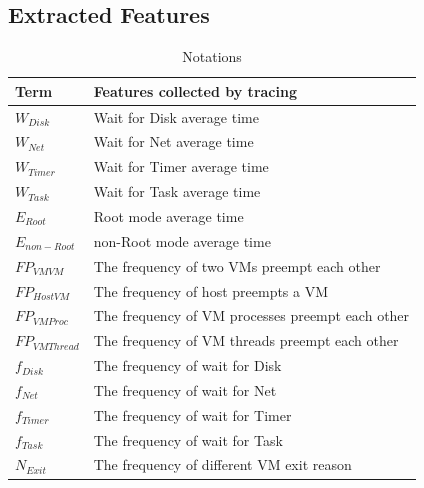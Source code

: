 \documentclass[10pt, conference, compsocconf]{IEEEtran}
\begin{document}
\subsection{Extracted Features}








\begin{table}
\caption{Notations}
\centering
\begin{tabular}{ll}
  \hline
  \rowcolor{Gray}
  \footnotesize \textbf{Term} & \footnotesize \textbf{Features collected by tracing} \\
  \hline
  \hline
  \footnotesize \textit{$W_{Disk}$} & \footnotesize Wait for Disk average time\\
  \footnotesize \textit{$W_{Net}$} & \footnotesize Wait for Net average time\\
  \footnotesize \textit{$W_{Timer}$} & \footnotesize Wait for Timer average time\\
  \footnotesize \textit{$W_{Task}$} & \footnotesize Wait for Task average time\\
  \footnotesize \textit{$E_{Root}$} & \footnotesize Root mode average time\\
  \footnotesize \textit{$E_{non-Root}$} & \footnotesize non-Root mode average time\\
  \footnotesize \textit{$FP_{VMVM}$} & \footnotesize The frequency of two VMs preempt each other\\
  \footnotesize \textit{$FP_{HostVM}$} & \footnotesize The frequency of host preempts a VM\\
  \footnotesize \textit{$FP_{VMProc}$} & \footnotesize The frequency of VM processes preempt each other\\
  \footnotesize \textit{$FP_{VMThread}$} & \footnotesize The frequency of VM threads preempt each other\\
  \footnotesize \textit{$f_{Disk}$} & \footnotesize The frequency of wait for Disk\\
  \footnotesize \textit{$f_{Net}$} & \footnotesize The frequency of wait for Net\\
  \footnotesize \textit{$f_{Timer}$} & \footnotesize The frequency of wait for Timer\\
  \footnotesize \textit{$f_{Task}$} & \footnotesize The frequency of wait for Task\\
  \footnotesize \textit{$N_{Exit}$} & \footnotesize The frequency of different VM exit reason\\

\end{tabular}
\end{table}
\end{document}
